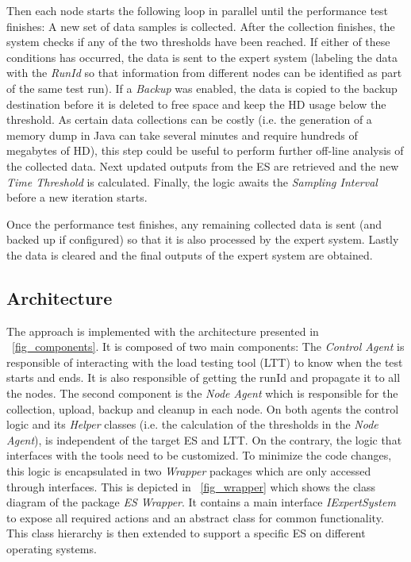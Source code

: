 \documentclass[runningheads,a4paper]{llncs}
\begin{document}
Then each node starts the following loop in parallel until the performance test
finishes: A new set of data samples is collected. After the collection finishes,
the system checks if any of the two thresholds have been reached. If either of
these conditions has occurred, the data is sent to the expert system (labeling the 
data with the \emph{RunId} so that information from different nodes can be
identified as part of the same test run). If a \emph{Backup} was enabled, the data 
is copied to the backup destination before it is deleted to free space and keep
the HD usage below the threshold. As certain data collections can be costly (i.e. 
the generation of a memory dump in Java can take several minutes and require
hundreds of megabytes of HD), this step could be useful to perform further
off-line analysis of the collected data. Next updated outputs from the ES are
retrieved and the new \emph{Time Threshold} is calculated. Finally, the logic
awaits the \emph{Sampling Interval} before a new iteration starts.

Once the performance test finishes, any remaining collected data is sent (and
backed up if configured) so that it is also processed by the
expert system. Lastly the data is cleared and the final outputs of the expert system are obtained.

\vspace{-7pt}
\subsection{Architecture}
\vspace{-7pt}
The approach is implemented with the architecture
presented in \figurename ~\ref{fig_components}. It is composed of two main components:
The \emph{Control Agent} is responsible of interacting with the load
testing tool (LTT) to know when the test starts and ends. It is also responsible
of getting the runId and propagate it to all the nodes. The second component is
the \emph{Node Agent} which is responsible for the collection, upload, backup and cleanup in each node. 
On both agents the control logic and its \emph{Helper} classes (i.e. the
calculation of the thresholds in the \emph{Node Agent}), is independent of the target ES and LTT. On the contrary, the logic that interfaces with the tools need to be
customized. To minimize the code changes, this logic is encapsulated in two
\emph{Wrapper} packages which are only accessed through interfaces.
This is depicted in \figurename ~\ref{fig_wrapper} which shows the class diagram
of the package \emph{ES Wrapper}. It contains a main interface
\emph{IExpertSystem} to expose all required actions and an abstract
class for common functionality. This class hierarchy is then extended to
support a specific ES on different operating systems.
\end{document}
